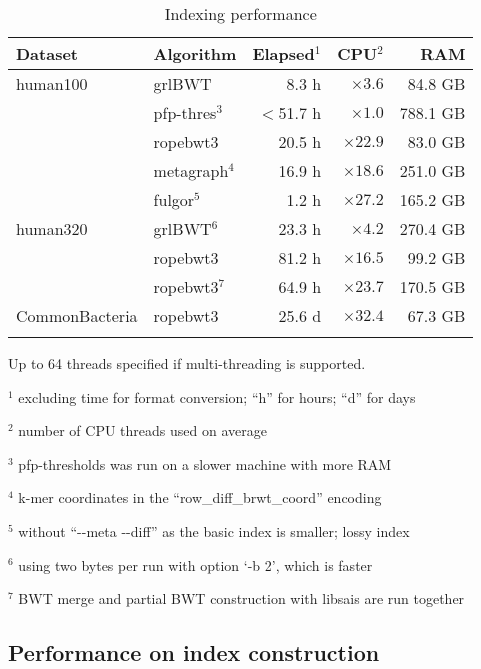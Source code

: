 \documentclass[webpdf,contemporary,large,namedate]{oup-authoring-template}%
\begin{document}
\begin{table}[b]
\caption{Indexing performance\label{tab:index}}
\begin{tabular*}{\columnwidth}{@{\extracolsep\fill}llrrr@{\extracolsep\fill}}
\toprule
Dataset        & Algorithm     & Elapsed$^1$ & CPU$^2$  &      RAM \\
\midrule
human100       & grlBWT        &  8.3 h       &  $\times3.6$ &  84.8 GB \\
		       & pfp-thres$^3$ &$<$51.7 h     &  $\times1.0$ & 788.1 GB \\
               & ropebwt3      & 20.5 h       & $\times22.9$ &  83.0 GB \\
			   & metagraph$^4$ & 16.9 h       & $\times18.6$ & 251.0 GB \\
			   & fulgor$^5$    & 1.2 h        & $\times27.2$ & 165.2 GB \\
human320       & grlBWT$^6$    & 23.3 h       &  $\times4.2$ & 270.4 GB \\
               & ropebwt3      & 81.2 h       & $\times16.5$ &  99.2 GB \\
               & ropebwt3$^7$  & 64.9 h       & $\times23.7$ & 170.5 GB \\
CommonBacteria & ropebwt3      & 25.6 d       & $\times32.4$ &  67.3 GB \\
\botrule
\end{tabular*}
\begin{tablenotes}\setlength\itemsep{0.0em}
\item Up to 64 threads specified if multi-threading is supported.
\item[$^{1}$] excluding time for format conversion; ``h'' for hours; ``d'' for days
\item[$^{2}$] number of CPU threads used on average
\item[$^{3}$] pfp-thresholds was run on a slower machine with more RAM
\item[$^{4}$] k-mer coordinates in the ``row\_diff\_brwt\_coord'' encoding
\item[$^{5}$] without ``-{}-meta -{}-diff'' as the basic index is smaller; lossy index
\item[$^{6}$] using two bytes per run with option `-b 2', which is faster
\item[$^{7}$] BWT merge and partial BWT construction with libsais are run together
\end{tablenotes}
\end{table}

\subsection{Performance on index construction}
\end{document}
